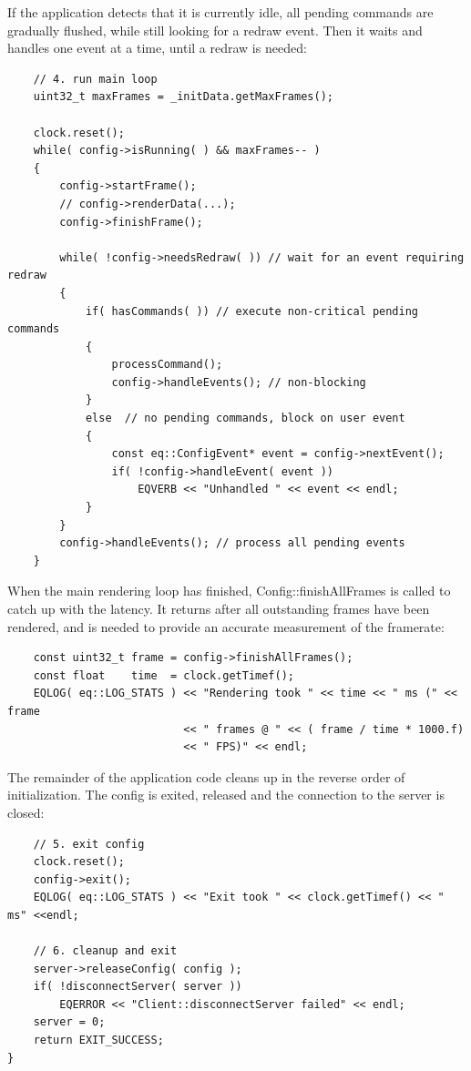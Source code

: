 \documentclass[10pt,a4]{scrartcl}
\begin{document}
If the application detects that it is currently idle, all pending
commands are gradually flushed, while still looking for a redraw
event. Then it waits and handles one event at a time, until a redraw is
needed:

{\footnotesize\begin{lstlisting}
    // 4. run main loop
    uint32_t maxFrames = _initData.getMaxFrames();
    
    clock.reset();
    while( config->isRunning( ) && maxFrames-- )
    {
        config->startFrame();
        // config->renderData(...);
        config->finishFrame();

        while( !config->needsRedraw( )) // wait for an event requiring redraw
        {
            if( hasCommands( )) // execute non-critical pending commands
            {
                processCommand();
                config->handleEvents(); // non-blocking
            }
            else  // no pending commands, block on user event
            {
                const eq::ConfigEvent* event = config->nextEvent();
                if( !config->handleEvent( event ))
                    EQVERB << "Unhandled " << event << endl;
            }
        }
        config->handleEvents(); // process all pending events
    }
\end{lstlisting}}%

When the main rendering loop has finished,
\textsf{Config::finishAllFrames} is called to catch up with the
latency. It returns after all outstanding frames have been rendered, and
is needed to provide an accurate measurement of the framerate:

{\footnotesize\begin{lstlisting}
    const uint32_t frame = config->finishAllFrames();
    const float    time  = clock.getTimef();
    EQLOG( eq::LOG_STATS ) << "Rendering took " << time << " ms (" << frame
                           << " frames @ " << ( frame / time * 1000.f)
                           << " FPS)" << endl;
\end{lstlisting}}%

The remainder of the application code cleans up in the reverse order of
initialization. The config is exited, released and the connection to
the server is closed:

{\footnotesize\begin{lstlisting}
    // 5. exit config
    clock.reset();
    config->exit();
    EQLOG( eq::LOG_STATS ) << "Exit took " << clock.getTimef() << " ms" <<endl;

    // 6. cleanup and exit
    server->releaseConfig( config );
    if( !disconnectServer( server ))
        EQERROR << "Client::disconnectServer failed" << endl;
    server = 0;
    return EXIT_SUCCESS;
}
\end{lstlisting}}%
\end{document}
